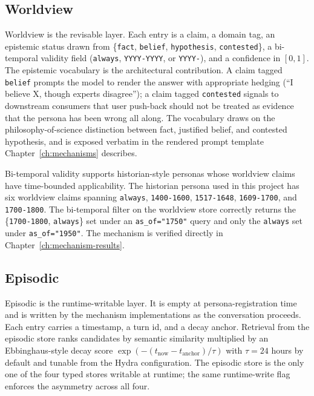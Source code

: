\subsection{Worldview}

Worldview is the revisable layer. Each entry is a claim, a domain tag, an epistemic status drawn from \{\texttt{fact}, \texttt{belief}, \texttt{hypothesis}, \texttt{contested}\}, a bi-temporal validity field (\texttt{always}, \texttt{YYYY-YYYY}, or \texttt{YYYY-}), and a confidence in $[0, 1]$. The epistemic vocabulary is the architectural contribution. A claim tagged \texttt{belief} prompts the model to render the answer with appropriate hedging (``I believe X, though experts disagree''); a claim tagged \texttt{contested} signals to downstream consumers that user push-back should not be treated as evidence that the persona has been wrong all along. The vocabulary draws on the philosophy-of-science distinction between fact, justified belief, and contested hypothesis, and is exposed verbatim in the rendered prompt template Chapter~\ref{ch:mechanisms} describes.

Bi-temporal validity supports historian-style personas whose worldview claims have time-bounded applicability. The historian persona used in this project has six worldview claims spanning \texttt{always}, \texttt{1400-1600}, \texttt{1517-1648}, \texttt{1609-1700}, and \texttt{1700-1800}. The bi-temporal filter on the worldview store correctly returns the \{\texttt{1700-1800}, \texttt{always}\} set under an \texttt{as\_of="1750"} query and only the \texttt{always} set under \texttt{as\_of="1950"}. The mechanism is verified directly in Chapter~\ref{ch:mechanism-results}.

\subsection{Episodic}

Episodic is the runtime-writable layer. It is empty at persona-registration time and is written by the mechanism implementations as the conversation proceeds. Each entry carries a timestamp, a turn id, and a decay anchor. Retrieval from the episodic store ranks candidates by semantic similarity multiplied by an Ebbinghaus-style decay score $\exp(-(t_{\text{now}} - t_{\text{anchor}}) / \tau)$ with $\tau = 24$ hours by default and tunable from the Hydra configuration. The episodic store is the only one of the four typed stores writable at runtime; the same runtime-write flag enforces the asymmetry across all four.

